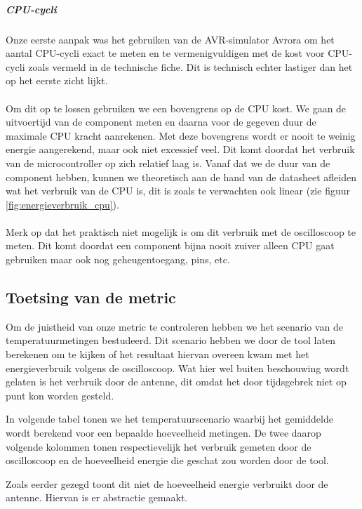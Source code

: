 \documentclass[11pt]{article}
\begin{document}
\subparagraph{CPU-cycli}

Onze eerste aanpak was het gebruiken van de AVR-simulator Avrora
\cite{titzer2005avrora} om het aantal CPU-cycli exact te meten en te
vermenigvuldigen met de kost voor CPU-cycli zoals vermeld in de technische
fiche. Dit is technisch echter lastiger dan het op het eerste zicht lijkt.
\\
\\
Om dit op te lossen gebruiken we een bovengrens op de CPU kost. We gaan de
uitvoertijd van de component meten en daarna voor de gegeven duur de maximale
CPU kracht aanrekenen. Met deze bovengrens wordt er nooit te weinig energie
aangerekend, maar ook niet excessief veel. Dit komt doordat het verbruik van de
microcontroller op zich relatief laag is. Vanaf dat we de duur van de
component hebben, kunnen we theoretisch aan de hand van de datasheet afleiden
wat het verbruik van de CPU is, dit is zoals te verwachten ook linear (zie figuur
\ref{fig:energieverbruik_cpu}).\\
\\
Merk op dat het praktisch niet mogelijk is om dit verbruik met de oscilloscoop te meten.
Dit komt doordat een component bijna nooit zuiver alleen CPU gaat gebruiken maar ook nog geheugentoegang, pins, etc. 

\subsection{Toetsing van de metric}

Om de juistheid van onze metric te controleren hebben we het scenario van de
temperatuurmetingen bestudeerd. Dit scenario hebben we door de tool laten
berekenen om te kijken of het resultaat hiervan overeen kwam met het
energieverbruik volgens de oscilloscoop. Wat hier wel buiten beschouwing
wordt gelaten is het verbruik door de antenne, dit omdat het door tijdsgebrek niet op punt kon worden gesteld.

In volgende tabel tonen we het temperatuurscenario waarbij het gemiddelde wordt
berekend voor een bepaalde hoeveelheid metingen. De twee daarop volgende
kolommen tonen respectievelijk het verbruik gemeten door de oscilloscoop en de
hoeveelheid energie die geschat zou worden door de tool.

Zoals eerder gezegd toont dit niet de hoeveelheid energie verbruikt door de antenne. Hiervan is er abstractie gemaakt. 
\end{document}
